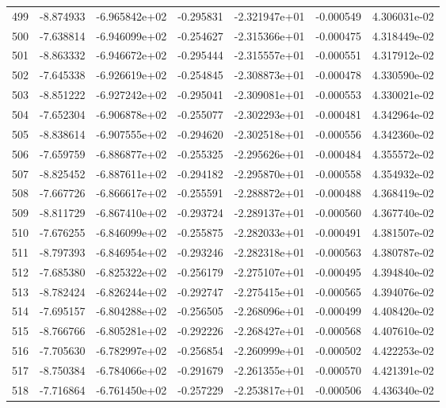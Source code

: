 \begin{tabular}{rrrrrrr}
 499 &  -8.874933 & -6.965842e+02 & -0.295831 & -2.321947e+01 &   -0.000549 &  4.306031e-02 \\
 500 &  -7.638814 & -6.946099e+02 & -0.254627 & -2.315366e+01 &   -0.000475 &  4.318449e-02 \\
 501 &  -8.863332 & -6.946672e+02 & -0.295444 & -2.315557e+01 &   -0.000551 &  4.317912e-02 \\
 502 &  -7.645338 & -6.926619e+02 & -0.254845 & -2.308873e+01 &   -0.000478 &  4.330590e-02 \\
 503 &  -8.851222 & -6.927242e+02 & -0.295041 & -2.309081e+01 &   -0.000553 &  4.330021e-02 \\
 504 &  -7.652304 & -6.906878e+02 & -0.255077 & -2.302293e+01 &   -0.000481 &  4.342964e-02 \\
 505 &  -8.838614 & -6.907555e+02 & -0.294620 & -2.302518e+01 &   -0.000556 &  4.342360e-02 \\
 506 &  -7.659759 & -6.886877e+02 & -0.255325 & -2.295626e+01 &   -0.000484 &  4.355572e-02 \\
 507 &  -8.825452 & -6.887611e+02 & -0.294182 & -2.295870e+01 &   -0.000558 &  4.354932e-02 \\
 508 &  -7.667726 & -6.866617e+02 & -0.255591 & -2.288872e+01 &   -0.000488 &  4.368419e-02 \\
 509 &  -8.811729 & -6.867410e+02 & -0.293724 & -2.289137e+01 &   -0.000560 &  4.367740e-02 \\
 510 &  -7.676255 & -6.846099e+02 & -0.255875 & -2.282033e+01 &   -0.000491 &  4.381507e-02 \\
 511 &  -8.797393 & -6.846954e+02 & -0.293246 & -2.282318e+01 &   -0.000563 &  4.380787e-02 \\
 512 &  -7.685380 & -6.825322e+02 & -0.256179 & -2.275107e+01 &   -0.000495 &  4.394840e-02 \\
 513 &  -8.782424 & -6.826244e+02 & -0.292747 & -2.275415e+01 &   -0.000565 &  4.394076e-02 \\
 514 &  -7.695157 & -6.804288e+02 & -0.256505 & -2.268096e+01 &   -0.000499 &  4.408420e-02 \\
 515 &  -8.766766 & -6.805281e+02 & -0.292226 & -2.268427e+01 &   -0.000568 &  4.407610e-02 \\
 516 &  -7.705630 & -6.782997e+02 & -0.256854 & -2.260999e+01 &   -0.000502 &  4.422253e-02 \\
 517 &  -8.750384 & -6.784066e+02 & -0.291679 & -2.261355e+01 &   -0.000570 &  4.421391e-02 \\
 518 &  -7.716864 & -6.761450e+02 & -0.257229 & -2.253817e+01 &   -0.000506 &  4.436340e-02 \\

\end{tabular}
